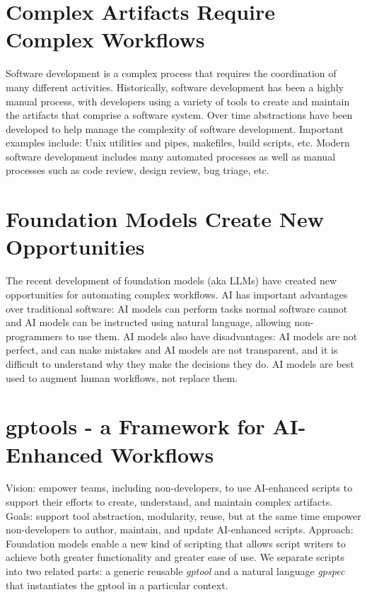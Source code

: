 \section{Complex Artifacts Require Complex Workflows}

Software development is a complex process that requires the coordination of many different activities. Historically, software development has been a highly manual process, with developers using a variety of tools to create and maintain the artifacts that comprise a software system. Over time abstractions have been developed to help manage the complexity of software development. Important examples include: Unix utilities and pipes, makefiles, build scripts, etc. Modern software development includes many automated processes as well as manual processes such as code review, design review, bug triage, etc.

\section{Foundation Models Create New Opportunities}

The recent development of foundation models (aka LLMs) have created new opportunities for automating complex workflows. AI has important advantages over traditional software: AI models can perform tasks normal software cannot and AI models can be instructed using natural language, allowing non-programmers to use them. AI models also have disadvantages: AI models are not perfect, and can make mistakes and AI models are not transparent, and it is difficult to understand why they make the decisions they do. AI models are best used to augment human workflows, not replace them.

\section{gptools - a Framework for AI-Enhanced Workflows}

Vision: empower teams, including non-developers, to use AI-enhanced scripts to support their efforts to create, understand, and maintain complex artifacts. Goals: support tool abstraction, modularity, reuse, but at the same time empower non-developers to author, maintain, and update AI-enhanced scripts. Approach: Foundation models enable a new kind of scripting that allows script writers to achieve both greater functionality and greater ease of use. We separate scripts into two related parts: a generic reusable \textit{gptool} and a natural language \textit{gpspec} that instantiates the gptool in a particular context.

